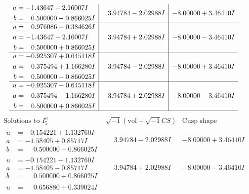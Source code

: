 \documentclass[1p]{elsarticle_modified}
\theoremstyle{definition}
\newcommand{\I}{\sqrt{-1}}
\begin{document}
$$\begin{array}{c|c|c}
\begin{aligned}
a &= -1.43647 - 2.16007 I \\
b &= \phantom{-}0.500000 - 0.866025 I\end{aligned}
 & \phantom{-}3.94784 - 2.02988 I & -8.00000 + 3.46410 I \\ \hline\begin{aligned}
u &= \phantom{-}0.976086 - 0.384626 I \\
a &= -1.43647 + 2.16007 I \\
b &= \phantom{-}0.500000 + 0.866025 I\end{aligned}
 & \phantom{-}3.94784 + 2.02988 I & -8.00000 - 3.46410 I \\ \hline\begin{aligned}
u &= -0.925307 + 0.645118 I \\
a &= \phantom{-}0.375494 + 1.166280 I \\
b &= \phantom{-}0.500000 - 0.866025 I\end{aligned}
 & \phantom{-}3.94784 - 2.02988 I & -8.00000 + 3.46410 I \\ \hline\begin{aligned}
u &= -0.925307 - 0.645118 I \\
a &= \phantom{-}0.375494 - 1.166280 I \\
b &= \phantom{-}0.500000 + 0.866025 I\end{aligned}
 & \phantom{-}3.94784 + 2.02988 I & -8.00000 - 3.46410 I\\
 \hline 
 \end{array}$$\newpage$$\begin{array}{c|c|c}  
\text{Solutions to }I^u_{5}& \I (\text{vol} + \sqrt{-1}CS) & \text{Cusp shape}\\
 \hline 
\begin{aligned}
u &= -0.154221 + 1.132760 I \\
a &= -1.58405 + 0.85717 I \\
b &= \phantom{-}0.500000 - 0.866025 I\end{aligned}
 & \phantom{-}3.94784 - 2.02988 I & -8.00000 + 3.46410 I \\ \hline\begin{aligned}
u &= -0.154221 - 1.132760 I \\
a &= -1.58405 - 0.85717 I \\
b &= \phantom{-}0.500000 + 0.866025 I\end{aligned}
 & \phantom{-}3.94784 + 2.02988 I & -8.00000 - 3.46410 I \\ \hline\begin{aligned}
u &= \phantom{-}0.656880 + 0.339024 I \\

\end{aligned}
\end{array}$$
\end{document}
